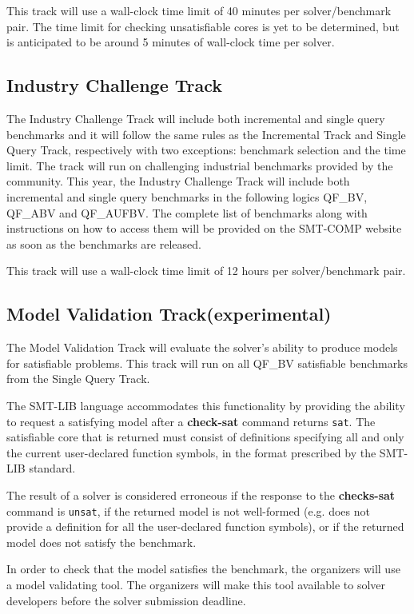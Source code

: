 \documentclass[12pt]{article}
\newcommand{\akey}[1]{\textbf{#1}}
\newcommand{\maintrack}{Single Query Track\xspace}
\newcommand{\inctrack}{Incremental Track\xspace}
\newcommand{\mvaltrack}{Model Validation Track\xspace}
\newcommand{\challtrack}{Industry Challenge Track\xspace}
\begin{document}
This track will use a wall-clock time limit of 40 minutes per solver/benchmark
pair. The time limit for checking unsatisfiable cores is yet to be determined, but is anticipated to
be around 5 minutes of wall-clock time per solver.

\subsection{\challtrack}
\label{sec:exec:industry-challenge}

The \challtrack will include both incremental and single query benchmarks and
it will follow the same rules as the \inctrack and  \maintrack, respectively
with two exceptions: benchmark selection and the time limit. The track will
run on challenging industrial benchmarks provided by the community. This year,
the \challtrack will include both incremental and single query benchmarks in the
following logics QF\_BV, QF\_ABV and QF\_AUFBV. The complete list of benchmarks
along with instructions on how to access them will be provided on the SMT-COMP
website as soon as the benchmarks are released.

This track will use a wall-clock time limit of 12 hours per solver/benchmark
pair.

\subsection{\mvaltrack (experimental)}
\label{sec:exec:model}
The \mvaltrack will evaluate the solver's ability to produce models
for satisfiable problems. This track will run on all QF\_BV satisfiable benchmarks
from the \maintrack.

The SMT-LIB language accommodates this functionality by providing the ability to
request a satisfying model after a \akey{check-sat} command returns \texttt{sat}.
The satisfiable core that is returned must consist of definitions specifying all
and only the current user-declared function symbols, in the format prescribed by
the SMT-LIB standard.

The result of a solver is considered erroneous if the response to the
\akey{checks-sat} command is \texttt{unsat}, if the returned model is not
well-formed (e.g. does not provide a definition for all the user-declared function
symbols), or if the returned model does not satisfy the benchmark.

In order to check that the model satisfies the benchmark, the organizers will use
a model validating tool. The organizers will make this tool available to solver
developers before the solver submission deadline.
\end{document}
